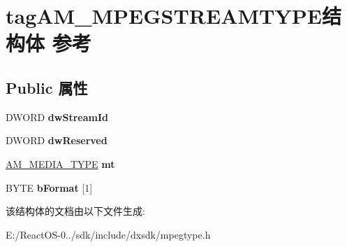 \hypertarget{structtag_a_m___m_p_e_g_s_t_r_e_a_m_t_y_p_e}{}\section{tag\+A\+M\+\_\+\+M\+P\+E\+G\+S\+T\+R\+E\+A\+M\+T\+Y\+P\+E结构体 参考}
\label{structtag_a_m___m_p_e_g_s_t_r_e_a_m_t_y_p_e}
\subsection*{Public 属性}
\begin{DoxyCompactItemize}
\item 
\mbox{\label{structtag_a_m___m_p_e_g_s_t_r_e_a_m_t_y_p_e_a0ceb918c7e8c98d6b8fd1eda7e665d3a}} 
D\+W\+O\+RD {\bfseries dw\+Stream\+Id}
\item 
\mbox{\label{structtag_a_m___m_p_e_g_s_t_r_e_a_m_t_y_p_e_a278b5640349d331a73ba832f6c586945}} 
D\+W\+O\+RD {\bfseries dw\+Reserved}
\item 
\mbox{\label{structtag_a_m___m_p_e_g_s_t_r_e_a_m_t_y_p_e_abba109c1fe1a56a88803b01bff36ead0}} 
\hyperlink{struct_a_m___m_e_d_i_a___t_y_p_e}{A\+M\+\_\+\+M\+E\+D\+I\+A\+\_\+\+T\+Y\+PE} {\bfseries mt}
\item 
\mbox{\label{structtag_a_m___m_p_e_g_s_t_r_e_a_m_t_y_p_e_aa61d12d87ff1acdd9bf92f4cbac6c2dd}} 
B\+Y\+TE {\bfseries b\+Format} \mbox{[}1\mbox{]}
\end{DoxyCompactItemize}


该结构体的文档由以下文件生成\+:\begin{DoxyCompactItemize}
\item 
E\+:/\+React\+O\+S-\/0../sdk/include/dxsdk/mpegtype.\+h\end{DoxyCompactItemize}
